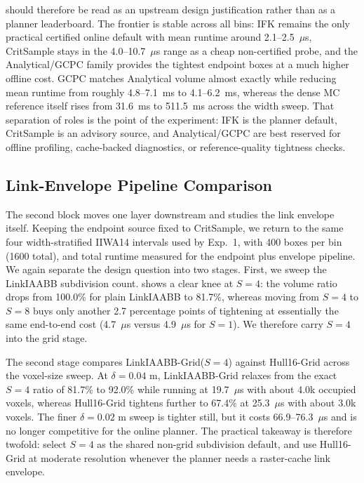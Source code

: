 \documentclass[journal]{IEEEtran}
\begin{document}
 should therefore be read as an upstream design
justification rather than as a planner leaderboard. The frontier is stable
across all bins: IFK remains the only practical certified online default with
mean runtime around 2.1--2.5~$\mu$s, CritSample stays in the 4.0--10.7~$\mu$s
range as a cheap non-certified probe, and the Analytical/GCPC family provides
the tightest endpoint boxes at a much higher offline cost. GCPC matches
Analytical volume almost exactly while reducing mean runtime from roughly
4.8--7.1~ms to 4.1--6.2~ms, whereas the dense MC reference itself rises from
31.6~ms to 511.5~ms across the width sweep. That separation of roles is the point
of the experiment: IFK is the planner default, CritSample is an advisory
source, and Analytical/GCPC are best reserved for offline profiling,
cache-backed diagnostics, or reference-quality tightness checks.



\subsection{Link-Envelope Pipeline Comparison}\label{sec:exp_linkenv}

The second block moves one layer downstream and studies the link envelope
itself. Keeping the endpoint source fixed to CritSample, we return to the
same four width-stratified IIWA14 intervals used by Exp.~1, with 400 boxes
per bin (1600 total), and total runtime measured for the endpoint plus
envelope pipeline. We again separate the design question into two stages.
First, we sweep the LinkIAABB subdivision count.
 shows a clear knee at $S=4$: the volume
ratio drops from 100.0\% for plain LinkIAABB to 81.7\%, whereas moving from
$S=4$ to $S=8$ buys only another 2.7 percentage points of tightening at
essentially the same end-to-end cost (4.7~$\mu$s versus 4.9~$\mu$s for
$S=1$). We therefore carry $S=4$ into the grid stage.

The second stage compares LinkIAABB-Grid($S=4$) against Hull16-Grid across the
voxel-size sweep. At $\delta=0.04$ m, LinkIAABB-Grid relaxes from the exact
$S=4$ ratio of 81.7\% to 92.0\% while running at 19.7~$\mu$s with about 4.0k
occupied voxels, whereas Hull16-Grid tightens further to 67.4\% at
25.3~$\mu$s with about 3.0k voxels. The finer $\delta=0.02$ m sweep is tighter
still, but it costs 66.9--76.3~$\mu$s and is no longer competitive for the
online planner. The practical takeaway is therefore twofold: select $S=4$ as
the shared non-grid subdivision default, and use Hull16-Grid at moderate
resolution whenever the planner needs a raster-cache link envelope.
\end{document}
